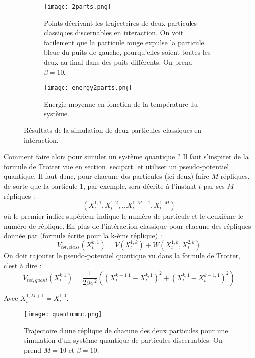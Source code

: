 \documentclass[11pt]{article}
\theoremstyle{definition}
\theoremstyle{remark}
\begin{document}
\begin{figure}[h]
\centering
\begin{subfigure}{.5\textwidth}
	\texttt{[image: 2parts.png]}
	\caption{Points décrivant les trajectoires de deux particules classiques discernables en interaction. On voit facilement que la particule rouge expulse la particule bleue du puits de gauche, pourqu'elles soient toutes les deux au final dans des puits différents. On prend $\beta=10$.}\label{fig:2parts}
\end{subfigure}%
\begin{subfigure}{.5\textwidth}
	\centering
	\texttt{[image: energy2parts.png]}
	\caption{Energie moyenne en fonction de la température du système.}\label{fig:energiemoy}
\end{subfigure}
\caption{Résultats de la simulation de deux particules classiques en intéraction.}\label{fig:sim2parts}
\end{figure}

Comment faire alors pour simuler un système quantique ? Il faut s'inspirer de la formule de Trotter vue en section \ref{sec:part} et utiliser un pseudo-potentiel quantique. Il faut donc, pour chacune des particules (ici deux) faire $M$ répliques, de sorte que la particule 1, par exemple, sera décrite à l'instant $t$ par ses $M$ répliques :
\begin{equation}
\left(X^{1,1}_t,X^{1,2}_t,\ldots X^{1,M-1}_t,X^{1,M}_t\right)
\end{equation}
où le premier indice supérieur indique le numéro de particule et le deuxième le numéro de réplique. En plus de l'intéraction classique pour chacune des répliques donnée par (formule écrite pour la k-ème réplique) :
\begin{equation}
V_{tot,class}(X^{k,1}_t)=V(X^{1,k}_t)+W(X^{1,k}_t,X^{2,k}_t)
\end{equation}
On doit rajouter le pseudo-potentiel quantique vu dans la formule de Trotter, c'est à dire :
\begin{equation}
V_{tot,quant}(X^{k,1}_t)=\frac{1}{2\beta\sigma^2}\left(\left(X^{k+1,1}_t-X^{k,1}_t\right)^2+\left(X^{k,1}_t-X^{k-1,1}_t\right)^2 \right)
\end{equation}

Avec $X^{1,M+1}_t=X^{1,0}_t$.
\\

\begin{figure}[h]
\centering
\texttt{[image: quantummc.png]}
\caption{Trajectoire d'une réplique de chacune des deux particules pour une simulation d'un système quantique de particules discernables. On prend $M=10$ et $\beta=10$.}\label{fig:quantummc}
\end{figure}
\end{document}
